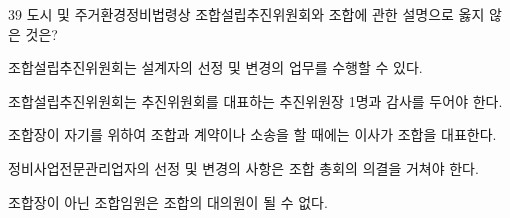 \begin{question}{39}
도시 및 주거환경정비법령상 조합설립추진위원회와 조합에 관한 설명으로 옳지 않은 것은?
\begin{choices}
  \item 조합설립추진위원회는 설계자의 선정 및 변경의 업무를 수행할 수 있다.
  \item 조합설립추진위원회는 추진위원회를 대표하는 추진위원장 1명과 감사를 두어야 한다.
  \item 조합장이 자기를 위하여 조합과 계약이나 소송을 할 때에는 이사가 조합을 대표한다.
  \item 정비사업전문관리업자의 선정 및 변경의 사항은 조합 총회의 의결을 거쳐야 한다.
  \item 조합장이 아닌 조합임원은 조합의 대의원이 될 수 없다.
\end{choices}
\end{question}
